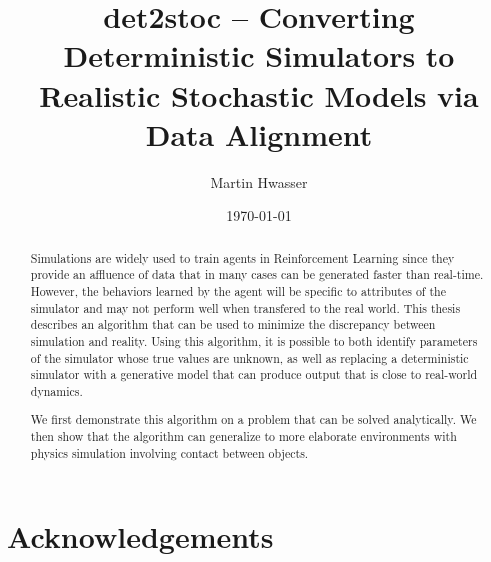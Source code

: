 \documentclass{kththesis}
\title{det2stoc -- Converting Deterministic Simulators to Realistic Stochastic Models via Data Alignment}
\author{Martin Hwasser}
\date{\today}
\begin{document}
\frontmatter
\titlepage
\begin{abstract}
Simulations are widely used to train agents in Reinforcement Learning since they provide an affluence of data that in many cases can be generated faster than real-time. However, the behaviors learned by the agent will be specific to attributes of the simulator and may not perform well when transfered to the real world. This thesis describes an algorithm that can be used to minimize the discrepancy between simulation and reality. Using this algorithm, it is possible to both identify parameters of the simulator whose true values are unknown, as well as replacing a deterministic simulator with a generative model that can produce output that is close to real-world dynamics.

We first demonstrate this algorithm on a problem that can be solved analytically. We then show that the algorithm can generalize to more elaborate environments with physics simulation involving contact between objects.

\end{abstract}
\begin{otherlanguage}{swedish}
  \begin{abstract}
  \end{abstract}
\end{otherlanguage}

\section*{Acknowledgements}


\tableofcontents
\mainmatter







 

\printbibliography[heading=bibintoc]
\end{document}
